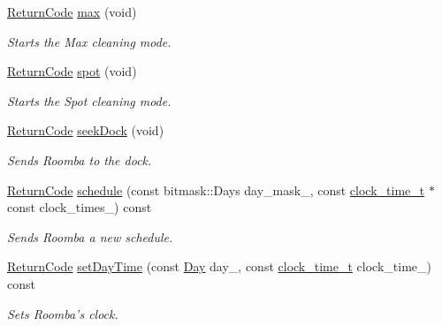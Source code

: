 \begin{DoxyCompactItemize}
\hyperlink{classroomba_1_1series500_1_1oi_1_1_o_i_encoder_ac2c8ad2f0306050926f89882d74696cc}{Return\+Code} \hyperlink{classroomba_1_1series500_1_1oi_1_1_o_i_encoder_a027e42d59c0ae1131928f2c42f076340}{max} (void)
\begin{DoxyCompactList}\small\item\em Starts the Max cleaning mode. \end{DoxyCompactList}\item 
\hyperlink{classroomba_1_1series500_1_1oi_1_1_o_i_encoder_ac2c8ad2f0306050926f89882d74696cc}{Return\+Code} \hyperlink{classroomba_1_1series500_1_1oi_1_1_o_i_encoder_a4a0dacfeeadc3fe61d86cc09a3f4357d}{spot} (void)
\begin{DoxyCompactList}\small\item\em Starts the Spot cleaning mode. \end{DoxyCompactList}\item 
\hyperlink{classroomba_1_1series500_1_1oi_1_1_o_i_encoder_ac2c8ad2f0306050926f89882d74696cc}{Return\+Code} \hyperlink{classroomba_1_1series500_1_1oi_1_1_o_i_encoder_a4995464b64134a5d8fbf5737ddd625be}{seek\+Dock} (void)
\begin{DoxyCompactList}\small\item\em Sends Roomba to the dock. \end{DoxyCompactList}\item 
\hyperlink{classroomba_1_1series500_1_1oi_1_1_o_i_encoder_ac2c8ad2f0306050926f89882d74696cc}{Return\+Code} \hyperlink{classroomba_1_1series500_1_1oi_1_1_o_i_encoder_a69fee4c553ddc88a6e3742a8e225dbf5}{schedule} (const bitmask\+::\+Days day\+\_\+mask\+\_\+, const \hyperlink{structroomba_1_1series500_1_1oi_1_1_o_i_encoder_1_1clock__time__t}{clock\+\_\+time\+\_\+t} $\ast$const clock\+\_\+times\+\_\+) const 
\begin{DoxyCompactList}\small\item\em Sends Roomba a new schedule. \end{DoxyCompactList}\item 
\hyperlink{classroomba_1_1series500_1_1oi_1_1_o_i_encoder_ac2c8ad2f0306050926f89882d74696cc}{Return\+Code} \hyperlink{classroomba_1_1series500_1_1oi_1_1_o_i_encoder_ab45c741ad238ae93592854dd13abe175}{set\+Day\+Time} (const \hyperlink{namespaceroomba_1_1series500_1_1oi_a46858f88a73ed1b4e2ebc7ede94d1d84}{Day} day\+\_\+, const \hyperlink{structroomba_1_1series500_1_1oi_1_1_o_i_encoder_1_1clock__time__t}{clock\+\_\+time\+\_\+t} clock\+\_\+time\+\_\+) const 
\begin{DoxyCompactList}\small\item\em Sets Roomba’s clock. \end{DoxyCompactList}\item 

\end{DoxyCompactItemize}
